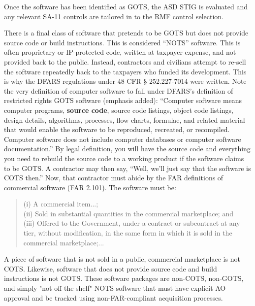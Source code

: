 Once the software has been identified as GOTS, the ASD STIG is evaluated and any relevant SA-11 controls are tailored in to the RMF control selection.

There is a final class of software that pretends to be GOTS but does not provide source code or build instructions. This is considered ``NOTS'' software. This is often proprietary or IP-protected code, written at taxpayer expense, and not provided back to the public. Instead, contractors and civilians attempt to re-sell the software repeatedly back to the taxpayers who funded its development. This is why the DFARS regulations under 48 CFR § 252.227-7014 were written. Note the very definition of computer software to fall under DFARS's definition of restricted rights GOTS software (emphasis added): ``Computer software means computer programs, \textbf{source code}, source code listings, object code listings, design details, algorithms, processes, flow charts, formulae, and related material that would enable the software to be reproduced, recreated, or recompiled. Computer software does not include computer databases or computer software documentation.'' By legal definition, you will have the source code and everything you need to rebuild the source code to a working product if the software claims to be GOTS. A contractor may then say, ``Well, we'll just say that the software is COTS then.'' Now, that contractor must abide by the FAR definitions of commercial software (FAR 2.101). The software must be:
\begin{quote}(i) A commercial item...;\\
(ii) Sold in substantial quantities in the commercial marketplace; and\\
(iii) Offered to the Government, under a contract or subcontract at any tier, without modification, in the same form in which it is sold in the commercial marketplace;...\autocite{20210405-far}\end{quote}

A piece of software that is not sold in a public, commercial marketplace is not COTS. Likewise, software that does not provide source code and build instructions is not GOTS. These software packages are non-COTS, non-GOTS, and simply "not off-the-shelf" NOTS software that must have explicit AO approval and be tracked using non-FAR-compliant acquisition processes.

